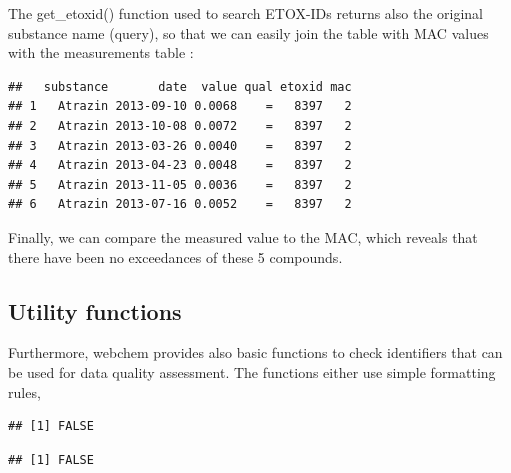 The get\_etoxid() function used to search ETOX-IDs returns also the original substance name (query),
so that we can easily join the table with MAC values with the measurements table :
\begin{knitrout}
\color{fgcolor}\begin{kframe}
\begin{alltt}
 \hlkwb{<-}   \hlstd{=} \hlstd{,}  \hlstd{=} \hlstd{)}
\end{alltt}
\begin{verbatim}
##   substance       date  value qual etoxid mac
## 1   Atrazin 2013-09-10 0.0068    =   8397   2
## 2   Atrazin 2013-10-08 0.0072    =   8397   2
## 3   Atrazin 2013-03-26 0.0040    =   8397   2
## 4   Atrazin 2013-04-23 0.0048    =   8397   2
## 5   Atrazin 2013-11-05 0.0036    =   8397   2
## 6   Atrazin 2013-07-16 0.0052    =   8397   2
\end{verbatim}
\end{kframe}
\end{knitrout}

Finally, we can compare the measured value to the MAC, which reveals that there have been no exceedances of these 5 compounds.




\subsection[Utility functions]{Utility functions}
Furthermore, webchem provides also basic functions to check identifiers that can be used for data quality assessment.
The functions either use simple formatting rules,

\begin{knitrout}
\color{fgcolor}\begin{kframe}
\begin{alltt}
\hlstd{(}\hlstd{)}
\end{alltt}


{\ttfamily\noindent\itshape\color{messagecolor}{\#\# Hyphens not at position 15 and 26.}}\begin{verbatim}
## [1] FALSE
\end{verbatim}
\begin{alltt}
\hlstd{(}\hlstd{)}
\end{alltt}


{\ttfamily\noindent\itshape\color{messagecolor}{\#\# Checksum is not correct! 5 vs. 6}}\begin{verbatim}
## [1] FALSE
\end{verbatim}
\end{kframe}
\end{knitrout}

